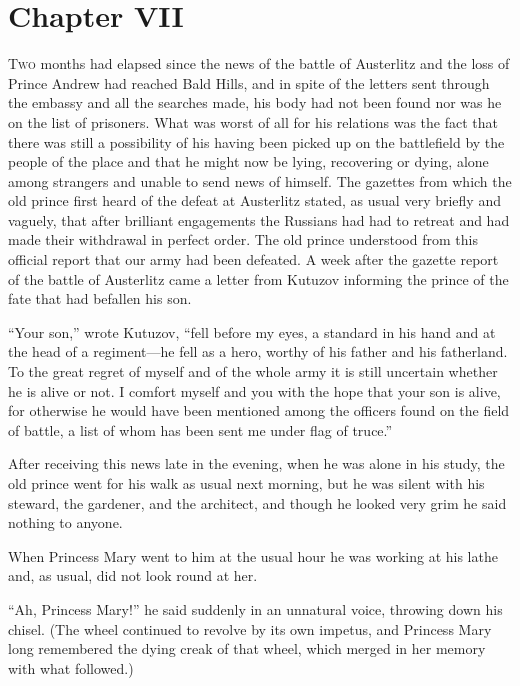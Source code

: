 \chapter*{Chapter VII}
\ifaudio     
{} 
\fi

\lettrine[lines=2, loversize=0.3, lraise=0]{\initfamily T}{wo}
months had elapsed since the news of the battle of Austerlitz
and the loss of Prince Andrew had reached Bald Hills, and in
spite of the letters sent through the embassy and all the
searches made, his body had not been found nor was he on the list
of prisoners. What was worst of all for his relations was the
fact that there was still a possibility of his having been picked
up on the battlefield by the people of the place and that he
might now be lying, recovering or dying, alone among strangers
and unable to send news of himself. The gazettes from which the
old prince first heard of the defeat at Austerlitz stated, as
usual very briefly and vaguely, that after brilliant engagements
the Russians had had to retreat and had made their withdrawal in
perfect order. The old prince understood from this official
report that our army had been defeated. A week after the gazette
report of the battle of Austerlitz came a letter from Kutuzov
informing the prince of the fate that had befallen his son.

``Your son,'' wrote Kutuzov, ``fell before my eyes, a standard in
his hand and at the head of a regiment---he fell as a hero,
worthy of his father and his fatherland. To the great regret of
myself and of the whole army it is still uncertain whether he is
alive or not. I comfort myself and you with the hope that your
son is alive, for otherwise he would have been mentioned among
the officers found on the field of battle, a list of whom has
been sent me under flag of truce.''

After receiving this news late in the evening, when he was alone
in his study, the old prince went for his walk as usual next
morning, but he was silent with his steward, the gardener, and
the architect, and though he looked very grim he said nothing to
anyone.

When Princess Mary went to him at the usual hour he was working
at his lathe and, as usual, did not look round at her.

``Ah, Princess Mary!'' he said suddenly in an unnatural voice,
throwing down his chisel. (The wheel continued to revolve by its
own impetus, and Princess Mary long remembered the dying creak of
that wheel, which merged in her memory with what followed.)

